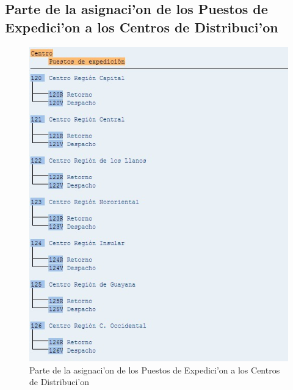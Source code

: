 \subsection*{Parte de la asignaci'on de los Puestos de Expedici'on a los Centros de Distribuci'on}
\begin{figure}[htb]
\centering
\includegraphics[scale=0.65,type=jpg,ext=.jpg,read=.jpg]{figures/ExpedicionCentro}
\caption{Parte de la asignaci'on de los Puestos de Expedici'on a los Centros de Distribuci'on}
\label{fig:asigna6}
\end{figure}
